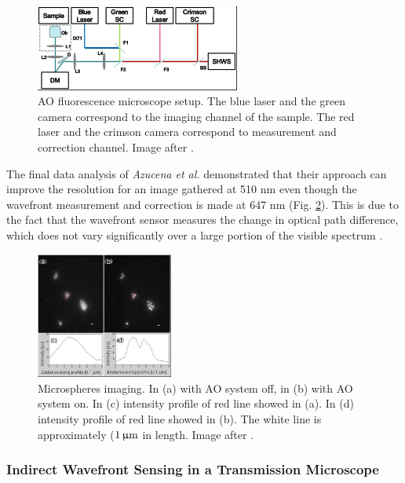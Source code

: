 \begin{figure}[htbp]
	\centering
			\includegraphics[width=0.60\textwidth]{images/Setup_widefield_direct.JPG}
		\caption{AO fluorescence microscope setup. The blue laser and the green camera correspond to the imaging channel of the sample. The red laser and the crimson camera correspond to measurement and correction channel. Image after \cite{wide_directSensing_microscope}.}
	\label{fig:Setup_widefield_direct}
\end{figure}


The final data analysis of \emph{Azucena et al.}  demonstrated that their approach can improve the resolution for an image gathered at 510 nm even though the wavefront measurement and correction is made at 647 nm (Fig. \ref{fig:wide_direct_results}). This is due to the fact that the wavefront sensor measures the change in optical path difference, which does not vary significantly over a large portion of the visible spectrum \cite{wide_directSensing_microscope}.

\begin{figure}[htbp]
	\centering
		\includegraphics[width=0.40\textwidth]{images/wide_direct_results.JPG}
		\caption{Microspheres imaging. In (a) with AO system off, in (b) with AO system on. In (c) intensity profile of red line showed in (a). In (d) intensity profile of red line showed in (b). The white line is approximately ($\unit[1]{\upmu m}$ in length. Image after \cite{wide_directSensing_microscope}.}
	\label{fig:wide_direct_results}
\end{figure}


\subsubsection{Indirect Wavefront Sensing in a Transmission Microscope}
\label{sec:TransmissionMicroscope}

